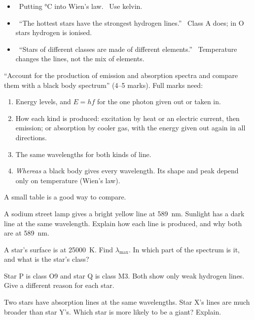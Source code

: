 \begin{mistakes}
\begin{itemize}
  \item \xmark\ Putting \si{\degreeCelsius} into Wien's law. \cmark\ Use kelvin.
  \item \xmark\ ``The hottest stars have the strongest hydrogen lines.'' \cmark\ Class A
        does; in O stars hydrogen is ionised.
  \item \xmark\ ``Stars of different classes are made of different elements.''
        \cmark\ Temperature changes the lines, not the mix of elements.
\end{itemize}
\end{mistakes}

\begin{examtip}
``Account for the production of emission and absorption spectra and compare them with a
black body spectrum'' (4--5 marks). Full marks need:
\begin{enumerate}
  \item Energy levels, and $E = hf$ for the one photon given out or taken in.
  \item How each kind is produced: excitation by heat or an electric current, then
        emission; or absorption by cooler gas, with the energy given out again in all
        directions.
  \item The same wavelengths for both kinds of line.
  \item \emph{Whereas} a black body gives every wavelength. Its shape and peak depend
        only on temperature (Wien's law).
\end{enumerate}
A small table is a good way to compare.
\end{examtip}

\begin{quickcheck}
  \item A sodium street lamp gives a bright yellow line at \qty{589}{nm}. Sunlight has a
        dark line at the same wavelength. Explain how each line is produced, and why both
        are at \qty{589}{nm}.
  \item A star's surface is at \qty{25000}{K}. Find $\lambda_\mathrm{max}$. In which part
        of the spectrum is it, and what is the star's class?
  \item Star P is class O9 and star Q is class M3. Both show only weak hydrogen lines.
        Give a different reason for each star.
  \item Two stars have absorption lines at the same wavelengths. Star X's lines are much
        broader than star Y's. Which star is more likely to be a giant? Explain.
\end{quickcheck}

